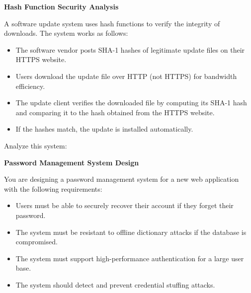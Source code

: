 \documentclass[10pt,a4paper,american]{exam}
\begin{document}
\begin{questions}
	\question[10] \textbf{Hash Function Security Analysis}

	A software update system uses hash functions to verify the integrity of downloads. The system works as follows:
	\begin{itemize}
		\item The software vendor posts SHA-1 hashes of legitimate update files on their HTTPS website.
		\item Users download the update file over HTTP (not HTTPS) for bandwidth efficiency.
		\item The update client verifies the downloaded file by computing its SHA-1 hash and comparing it to the hash obtained from the HTTPS website.
		\item If the hashes match, the update is installed automatically.
	\end{itemize}

	Analyze this system:

	\question[10] \textbf{Password Management System Design}

	You are designing a password management system for a new web application with the following requirements:
	\begin{itemize}
		\item Users must be able to securely recover their account if they forget their password.
		\item The system must be resistant to offline dictionary attacks if the database is compromised.
		\item The system must support high-performance authentication for a large user base.
		\item The system should detect and prevent credential stuffing attacks.
	\end{itemize}


\end{questions}
\end{document}
